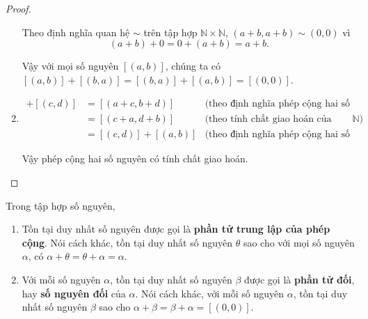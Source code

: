 \begin{proof}
\begin{enumerate}[label={(\roman*)}]
              Theo định nghĩa quan hệ $\sim$ trên tập hợp $\mathbb{N}\times\mathbb{N}$, $(a+b, a+b)\sim (0, 0)$ vì
              \[
                  (a+b) + 0 = 0 + (a+b) = a+b.
              \]

              Vậy với mọi số nguyên $[(a, b)]$, chúng ta có $[(a, b)] + [(b, a)] = [(b, a)] + [(a, b)] = [(0, 0)]$.
        \item \begin{align*}
                  [(a, b)] + [(c, d)] & = [(a+c, b+d)]        & \text{(theo định nghĩa phép cộng hai số nguyên)}                  \\
                                      & = [(c+a, d+b)]        & \text{(theo tính chất giao hoán của phép cộng trên $\mathbb{N}$)} \\
                                      & = [(c, d)] + [(a, b)] & \text{(theo định nghĩa phép cộng hai số nguyên)}
              \end{align*}

              Vậy phép cộng hai số nguyên có tính chất giao hoán.
    \end{enumerate}
\end{proof}

\begin{theorem}\label{theorem:uniqueness-of-additive-identity-and-additive-inverse}
    Trong tập hợp số nguyên,
    \begin{enumerate}[label={(\roman*)}]
        \item Tồn tại duy nhất số nguyên được gọi là \textbf{phần tử trung lập của phép cộng}. Nói cách khác, tồn tại duy nhất số nguyên $\theta$ sao cho với mọi số nguyên $\alpha$, có $\alpha + \theta = \theta + \alpha = \alpha$.
        \item Với mỗi số nguyên $\alpha$, tồn tại duy nhất số nguyên $\beta$ được gọi là \textbf{phần tử đối}, hay \textbf{số nguyên đối} của $\alpha$. Nói cách khác, với mỗi số nguyên $\alpha$, tồn tại duy nhất số nguyên $\beta$ sao cho $\alpha + \beta = \beta + \alpha = [(0,0)]$.
    \end{enumerate}
\end{theorem}

